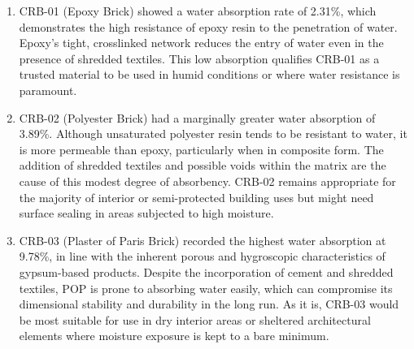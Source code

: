 \begin{enumerate}
	\item CRB-01 (Epoxy Brick) showed a water absorption rate of 2.31\%, which demonstrates the high resistance of epoxy resin to the penetration of water. Epoxy's tight, crosslinked network reduces the entry of water even in the presence of shredded textiles. This low absorption qualifies CRB-01 as a trusted material to be used in humid conditions or where water resistance is paramount.
	\item CRB-02 (Polyester Brick) had a marginally greater water absorption of 3.89\%. Although unsaturated polyester resin tends to be resistant to water, it is more permeable than epoxy, particularly when in composite form. The addition of shredded textiles and possible voids within the matrix are the cause of this modest degree of absorbency. CRB-02 remains appropriate for the majority of interior or semi-protected building uses but might need surface sealing in areas subjected to high moisture.
	\item CRB-03 (Plaster of Paris Brick) recorded the highest water absorption at 9.78\%, in line with the inherent porous and hygroscopic characteristics of gypsum-based products. Despite the incorporation of cement and shredded textiles, POP is prone to absorbing water easily, which can compromise its dimensional stability and durability in the long run. As it is, CRB-03 would be most suitable for use in dry interior areas or sheltered architectural elements where moisture exposure is kept to a bare minimum.
\end{enumerate}